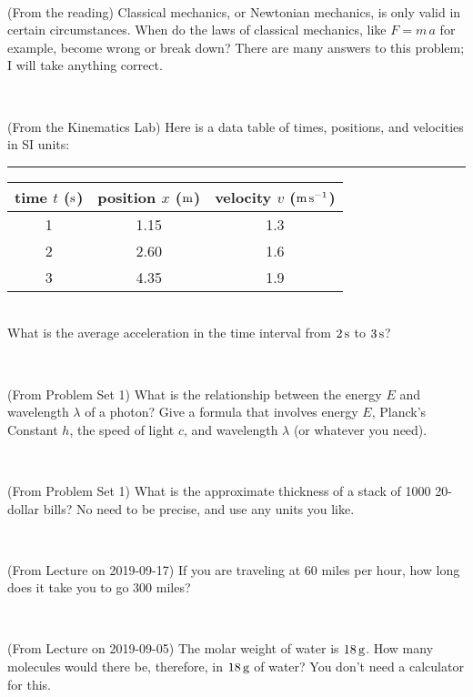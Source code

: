 \documentclass[12pt, letterpaper]{article}
\begin{document}
\vfill ~

\begin{problem} (From the reading)
Classical mechanics, or Newtonian mechanics, is only valid in certain
circumstances. When do the laws of classical mechanics, like $F =
m\,a$ for example, become wrong or break down? There are many answers
to this problem; I will take anything correct.
\end{problem}


\vfill ~

\begin{problem} (From the Kinematics Lab)
Here is a data table of times, positions, and velocities in SI units:\\
\rule{1.0in}{0pt}\begin{tabular}{c|c|c}
time $t$ ($\mathrm{s}$) & position $x$ ($\mathrm{m}$) & velocity $v$ ($\mathrm{m}\,\mathrm{s}^{-1}$) \\
\hline
1 & 1.15 & 1.3 \\
2 & 2.60 & 1.6 \\
3 & 4.35 & 1.9 \\
\hline
\end{tabular}\\
What is the average acceleration in the time interval from $2\,\mathrm{s}$ to $3\,\mathrm{s}$?
\end{problem}


\vfill ~

\begin{problem} (From Problem Set 1)
What is the relationship between the energy $E$ and wavelength
$\lambda$ of a photon? Give a formula that involves energy $E$,
Planck's Constant $h$, the speed of light $c$, and wavelength
$\lambda$ (or whatever you need).
\end{problem}

\vfill ~


\clearpage


\begin{problem} (From Problem Set 1)
What is the approximate thickness of a stack of 1000 20-dollar bills?
No need to be precise, and use any units you like.
\end{problem}


\vfill ~

\begin{problem} (From Lecture on 2019-09-17)
If you are traveling at 60 miles per hour, how long does
it take you to go 300 miles?
\end{problem}


\vfill ~

\begin{problem} (From Lecture on 2019-09-05)
The molar weight of water is $18\,\mathrm{g}$. How many molecules would there
be, therefore, in $18\,\mathrm{g}$ of water? You don't need a calculator for
this.
\end{problem}
\end{document}
